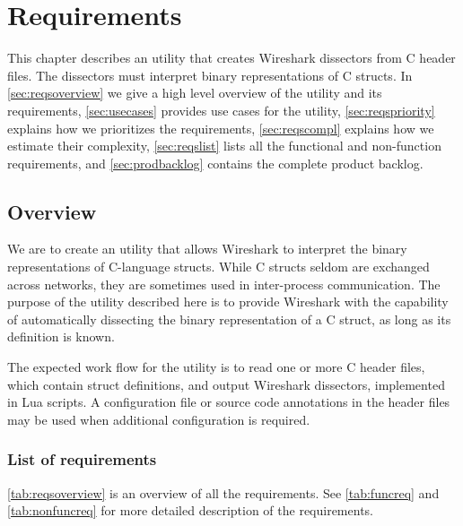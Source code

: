 \chapter{Requirements}
\label{chap:requirements}
This chapter describes an utility that creates Wireshark dissectors from C
header files. The dissectors must interpret binary representations of C
structs. In \autoref{sec:reqsoverview} we give a high level overview of the
utility and its requirements, \autoref{sec:usecases} provides use cases for the
utility, \autoref{sec:reqspriority} explains how we prioritizes the
requirements, \autoref{sec:reqscompl} explains how we estimate their
complexity, \autoref{sec:reqslist} lists all the functional and non-function
requirements, and \autoref{sec:prodbacklog} contains the complete product
backlog.

\section{Overview}
\label{sec:reqsoverview}
We are to create an utility that allows Wireshark to interpret the binary
representations of C-language structs. While C structs seldom are exchanged
across networks, they are sometimes used in inter-process communication. The
purpose of the utility described here is to provide Wireshark with the
capability of automatically dissecting the binary representation of a C struct,
as long as its definition is known.

The expected work flow for the utility is to read one or more C header files,
which contain struct definitions, and output Wireshark dissectors, implemented
in Lua scripts. A configuration file or source code annotations in the header
files may be used when additional configuration is required.

\subsection{List of requirements}
\autoref{tab:reqsoverview} is an overview of all the requirements. See
\autoref{tab:funcreq} and \autoref{tab:nonfuncreq} for more detailed
description of the requirements.

